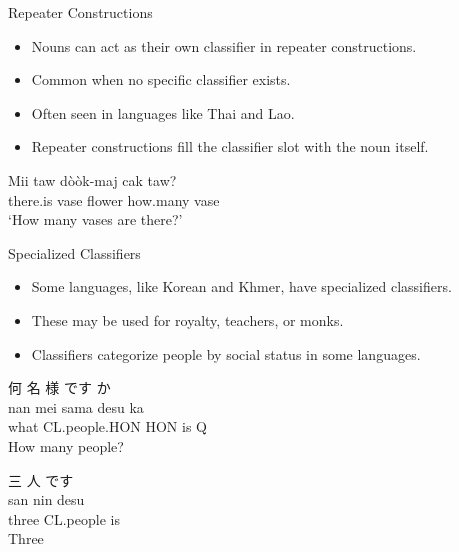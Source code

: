 \documentclass{beamer}
\begin{document}
\begin{frame}{Repeater Constructions}
\begin{itemize}
    \item Nouns can act as their own classifier in repeater constructions.
    \item Common when no specific classifier exists.
    \item Often seen in languages like Thai and Lao.
    \item Repeater constructions fill the classifier slot with the noun itself.
\end{itemize}
\begin{exe}
\ex
\gll Mii taw dòòk-maj cak taw? \\
    there.is vase flower how.many vase \\
\trans ‘How many vases are there?’ \\
\end{exe}
\end{frame}


\begin{frame}{Specialized Classifiers}
\begin{itemize}
    \item Some languages, like Korean and Khmer, have specialized classifiers.
    \item These may be used for royalty, teachers, or monks.
    \item Classifiers categorize people by social status in some languages.
    \end{itemize}
\begin{exe}
\ex
\glll 何 名 様 です か \\
    nan mei sama desu ka \\
 what CL.people.HON HON is Q \\
\trans How many people? \\
\end{exe}
\begin{exe}
\ex
\glll 三 人 です \\
    san nin desu \\
 three CL.people is \\
\trans Three \\
\end{exe}
    
\end{frame}
\end{document}

